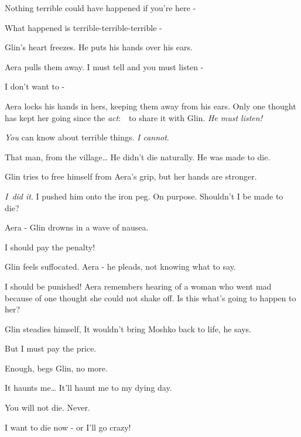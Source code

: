 \documentclass[letterpaper]{article}
\begin{document}
{\textquotedbl}Nothing terrible could have happened if you're here -{\textquotedbl} 

{\textquotedbl}What happened is terrible-terrible-terrible -{\textquotedbl} 

Glin's heart freezes. He puts his hands over his ears. 

Aera pulls them away. {\textquotedbl}I must tell and you must listen -{\textquotedbl} 

{\textquotedbl}I don't want to -{\textquotedbl} 

Aera locks his hands in hers, keeping them away from his ears. Only one thought has kept her going since the
\textit{act}:\ \ to share it with Glin. \textit{He must listen! }

{\textquotedbl}\textit{You} can know about terrible things. \textit{I cannot}.{\textquotedbl} \ 

{\textquotedbl}That man, from the village{\dots} He didn't die naturally. He was made to die.{\textquotedbl} 

Glin tries to free himself from Aera's grip, but her hands are stronger. 

{\textquotedbl}\textit{I}\ \textit{did it}. I pushed him onto the iron peg. On purpose. Shouldn't I be made to
die?{\textquotedbl} 

{\textquotedbl}Aera -{\textquotedbl} Glin drowns in a wave of nausea. 

{\textquotedbl}I should pay the penalty!{\textquotedbl}

Glin feels suffocated. {\textquotedbl}Aera -{\textquotedbl} he pleads, not knowing what to say. 

{\textquotedbl}I should be punished!{\textquotedbl} Aera remembers hearing of a woman who went mad because of one
thought she could not shake off. Is this what's going to happen to her? 

Glin steadies himself, {\textquotedbl}It wouldn't bring Moshko back to life,{\textquotedbl} he says. 

{\textquotedbl}But I must pay the price.{\textquotedbl} 

{\textquotedbl}Enough,{\textquotedbl} begs Glin, {\textquotedbl}no more.{\textquotedbl} 

{\textquotedbl}It haunts me{\dots} It'll haunt me to my dying day.{\textquotedbl} 

{\textquotedbl}You will not die. Never.{\textquotedbl} 

{\textquotedbl}I want to die now - or I'll go crazy!{\textquotedbl} 
\end{document}
